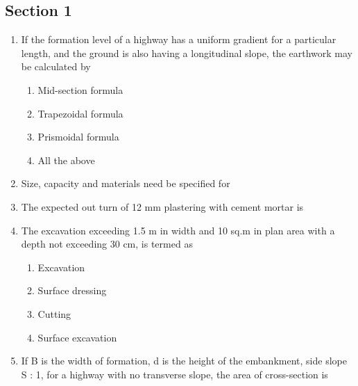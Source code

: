 \documentclass[11pt,a4paper]{article}
\begin{document}
\subsection*{Section 1}
\begin{enumerate}
\item{If the formation level of a highway has a uniform gradient for a particular length, and the ground is also having a longitudinal slope, the earthwork may be calculated by}
\begin{enumerate}[label=\Alph*.]
\item{Mid-section formula}
\item{Trapezoidal formula}
\item{Prismoidal formula}
\item{All the above}
\end{enumerate}
\item{Size, capacity and materials need be specified for}
\\
\item{The expected out turn of 12 mm plastering with cement mortar is}
\\
\item{The excavation exceeding 1.5 m in width and 10 sq.m in plan area with a depth not exceeding 30 cm, is termed as}
\begin{enumerate}[label=\Alph*.]
\item{Excavation}
\item{Surface dressing}
\item{Cutting}
\item{Surface excavation}
\end{enumerate}
\item{If B is the width of formation, d is the height of the embankment, side slope S : 1, for a highway with no transverse slope, the area of cross-section is}

\end{enumerate}
\end{document}
